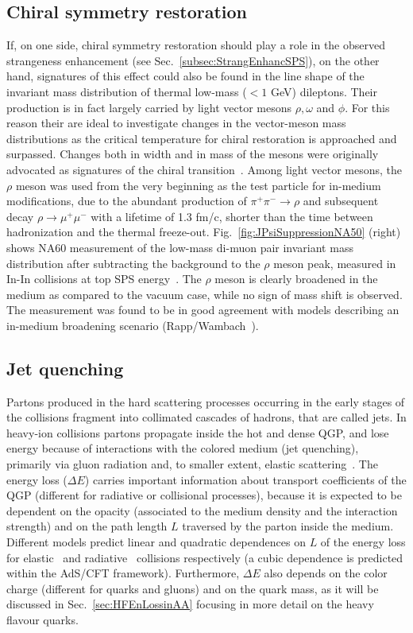 \subsection{Chiral symmetry restoration}
If, on one side, chiral symmetry restoration should play a role in the 
observed strangeness enhancement (see Sec.~\ref{subsec:StrangEnhancSPS}),
on the other hand, signatures of this effect could also be found in the line shape of the
invariant mass distribution of thermal low-mass ($< 1$ GeV) dileptons.
Their production is in fact largely carried by light 
vector mesons $\rho, \omega$ and $\phi$. For this reason their are ideal to investigate
changes in the vector-meson mass distributions as the critical temperature for chiral
restoration is approached and surpassed. Changes both in width and in mass of
the mesons were originally advocated as signatures of the chiral transition~\cite{Pisarski:1981mq}. 
Among light vector mesons, the $\rho$ meson was used from the very beginning as the test particle for in-medium 
modifications, due to the abundant production
of $\pi^+ \pi^- \rightarrow \rho$ and subsequent decay $\rho \rightarrow \mu^+ \mu^- $ 
with a lifetime of 1.3 fm/c, shorter than the time between hadronization and the thermal freeze-out. 
Fig.~\ref{fig:JPsiSuppressionNA50} (right) shows NA60 measurement of the 
low-mass di-muon pair invariant mass distribution after 
subtracting the background to the $\rho$ meson peak, 
measured in In-In collisions at top SPS energy~\cite{Damjanovic:2005ni}. The $\rho$ meson is
clearly broadened in the medium as compared to the vacuum case, 
while no sign of mass shift is observed. The measurement
was found to be in good agreement with models describing an in-medium broadening 
scenario (Rapp/Wambach~\cite{Rapp:2012zq}).

\subsection{Jet quenching}
\label{sec:JetQuenching}
Partons produced in the hard scattering processes occurring in the early stages of the 
collisions fragment into collimated cascades of hadrons, that are called jets. 
In heavy-ion collisions partons propagate inside the hot and dense QGP,
 and lose energy because of interactions with the colored medium 
 (jet quenching), primarily via gluon radiation and, to smaller extent, 
 elastic scattering~\cite{Qin:2015srf}. The energy loss ($\Delta E$) carries 
 important information about transport coefficients 
 of the QGP (different for radiative or collisional processes), because it
  is expected to be dependent on the opacity 
 (associated to the medium density and the interaction strength) 
 and on the path length $L$ traversed by the parton inside the medium.
  Different models predict linear and quadratic dependences on $L$ 
  of the energy loss for elastic~\cite{Thoma:1990fm} and radiative~\cite{Baier:1996sk} 
  collisions respectively (a cubic dependence is predicted within the 
  AdS/CFT framework). Furthermore, $\Delta E$ also depends on the 
  color charge (different for quarks and gluons) and on the quark mass, 
  as it will be discussed in Sec.~\ref{sec:HFEnLossinAA} focusing in more detail on the heavy flavour quarks.

